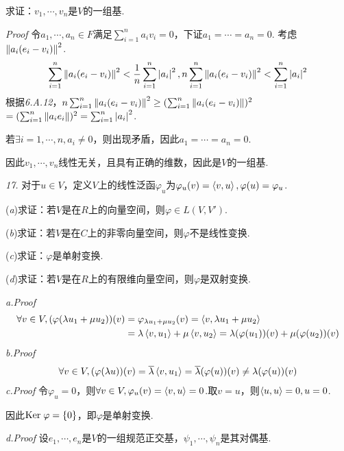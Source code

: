 求证：\(v_1,\cdots,v_n\)是\(V\)的一组基.

\textit{Proof}
令\(a_1,\cdots,a_n \in F\)满足\(\sum_{i=1}^n a_iv_i=0\)，下证\(a_1=\cdots=a_n=0\).
考虑\(\left\lVert a_i(e_i-v_i) \right\rVert^2\).
    \begin{align*}
        \sum_{i=1}^n \left\lVert a_i(e_i-v_i) \right\rVert^2<\dfrac{1}{n}\sum_{i=1}^n \left\lvert a_i \right\rvert^2,
        n\sum_{i=1}^n \left\lVert a_i(e_i-v_i) \right\rVert^2<\sum_{i=1}^n \left\lvert a_i \right\rvert^2
    \end{align*}
根据\textit{6.A.12}，\(n\sum_{i=1}^n \left\lVert a_i(e_i-v_i) \right\rVert^2 \geq (\sum_{i=1}^n \left\lVert a_i(e_i-v_i) \right\rVert)^2\)
\(=(\sum_{i=1}^n \left\lVert a_ie_i \right\rVert)^2=\sum_{i=1}^n \left\lvert a_i \right\rvert^2\).

若\(\exists i=1,\cdots,n,a_i \ne 0\)，则出现矛盾，因此\(a_1=\cdots=a_n=0\).

因此\(v_1,\cdots,v_n\)线性无关，且具有正确的维数，因此是\(V\)的一组基.

\newpage

\textit{17.}
对于\(u \in V\)，定义\(V\)上的线性泛函\(\varphi_u\)为\(\varphi_u(v)=\left\langle v,u \right\rangle,\varphi(u)=\varphi_u\).

(\textit{a})求证：若\(V\)是在\(R\)上的向量空间，则\(\varphi \in L(V,V')\).

(\textit{b})求证：若\(V\)是在\(C\)上的非零向量空间，则\(\varphi\)不是线性变换.

(\textit{c})求证：\(\varphi\)是单射变换.

(\textit{d})求证：若\(V\)是在\(R\)上的有限维向量空间，则\(\varphi\)是双射变换.

\textit{a.Proof}
    \begin{align*}
        \forall v \in V,(\varphi(\lambda u_1+\mu u_2))(v)
        &=\varphi_{\lambda u_1+\mu u_2}(v)=\left\langle v,\lambda u_1+\mu u_2 \right\rangle \\
        &=\lambda \left\langle v,u_1 \right\rangle+\mu \left\langle v,u_2 \right\rangle=\lambda (\varphi(u_1))(v)+\mu (\varphi(u_2))(v)
    \end{align*}
\textit{b.Proof}
    \begin{align*}
        \forall v \in V,(\varphi(\lambda u))(v)=\overline{\lambda} \left\langle v,u_1 \right\rangle
        =\overline{\lambda} (\varphi(u))(v) \ne \lambda (\varphi(u))(v)
    \end{align*}
\textit{c.Proof}
令\(\varphi_u=0\)，则\(\forall v \in V,\varphi_u(v)=\left\langle v,u \right\rangle=0\).取\(v=u\)，则\(\left\langle u,u \right\rangle=0,u=0\).

因此\(\mathrm{Ker \;} \varphi=\{0\}\)，即\(\varphi\)是单射变换.

\textit{d.Proof}
设\(e_1,\cdots,e_n\)是\(V\)的一组规范正交基，\(\psi_1,\cdots,\psi_n\)是其对偶基.

